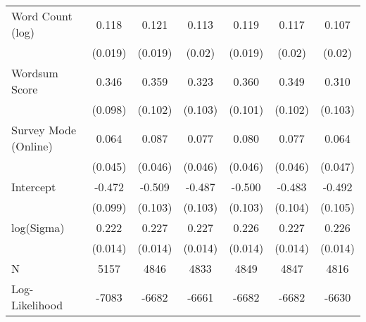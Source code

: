 \begin{table}[ht]
\begin{tabular}{lcccccc}
  Word Count (log) &  0.118 &  0.121 &  0.113 &  0.119 &  0.117 &  0.107 \\ 
   & (0.019) & (0.019) & (0.02) & (0.019) & (0.02) & (0.02) \\ 
  Wordsum Score &  0.346 &  0.359 &  0.323 &  0.360 &  0.349 &  0.310 \\ 
   & (0.098) & (0.102) & (0.103) & (0.101) & (0.102) & (0.103) \\ 
  Survey Mode (Online) &  0.064 &  0.087 &  0.077 &  0.080 &  0.077 &  0.064 \\ 
   & (0.045) & (0.046) & (0.046) & (0.046) & (0.046) & (0.047) \\ 
  Intercept & -0.472 & -0.509 & -0.487 & -0.500 & -0.483 & -0.492 \\ 
   & (0.099) & (0.103) & (0.103) & (0.103) & (0.104) & (0.105) \\ 
  log(Sigma) &  0.222 &  0.227 &  0.227 &  0.226 &  0.227 &  0.226 \\ 
   & (0.014) & (0.014) & (0.014) & (0.014) & (0.014) & (0.014) \\ 
   \hline
N & 5157 & 4846 & 4833 & 4849 & 4847 & 4816 \\ 
  Log-Likelihood & -7083 & -6682 & -6661 & -6682 & -6682 & -6630 \\ 
   \hline
\end{tabular}
\endgroup
\end{table}
